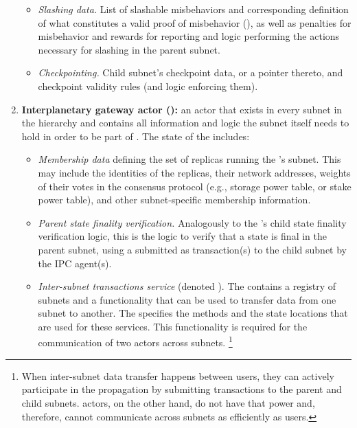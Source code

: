 \begin{enumerate}
\begin{itemize}
        \item \emph{Slashing data.} List of slashable misbehaviors and corresponding definition of what constitutes a valid proof of misbehavior (\pom), as well as penalties for misbehavior and rewards for reporting \pom and logic performing the actions necessary for slashing in the parent subnet.
        \item \emph{Checkpointing.} Child subnet's checkpoint data, or a pointer thereto, and checkpoint validity rules (and logic enforcing them).
    \end{itemize}
    \item \textbf{Interplanetary gateway actor (\gw):} an actor that exists in every subnet in the \ipc hierarchy and contains all information and logic the subnet itself needs to hold in order to be part of \ipc. The state of the \gw includes:
    \begin{itemize}
        \item
        \emph{Membership data} defining the set of replicas running the \gw's subnet.
        This may include the identities of the replicas, their network addresses, weights of their votes in the consensus protocol (e.g., storage power table, or stake power table), and other subnet-specific membership information.

        \item \emph{Parent state finality verification.} Analogously to the \sa's child state finality verification logic,
        this is the logic to verify that a state is final in the parent subnet,
        using a \pof submitted as transaction(s) to the child subnet by the IPC agent(s).
        \item \emph{Inter-subnet transactions service} (denoted \postoffice). 
        The \gw contains a registry of subnets and a functionality that can be used to transfer data from one subnet to another. 
        The \postoffice specifies the methods and the state locations that are used for these services.
        This functionality is required for the communication of two actors across subnets.%
\footnote{When inter-subnet data transfer happens between users, they can actively participate in the propagation by submitting transactions to the parent and child subnets. actors, on the other hand, do not have that power and, therefore, cannot communicate across subnets as efficiently as users.}
    \end{itemize}
\end{enumerate}


